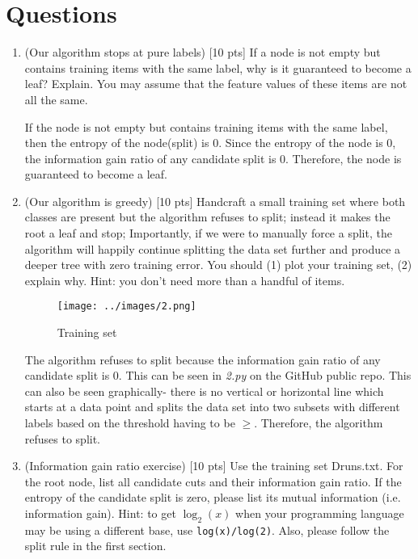 \documentclass[a4paper]{article}
\theoremstyle{definition}
\newenvironment{soln}{
    \leavevmode\color{blue}\ignorespaces
}{}
\begin{document}
\section{Questions}
\begin{enumerate}
\item (Our algorithm stops at pure labels) [10 pts] If a node is not empty but contains training items with the same label, why is it guaranteed to become a leaf?  Explain. You may assume that the feature values of these items are not all the same. \\

\begin{soln}
  If the node is not empty but contains training items with the same label, then the entropy of the node(split) is 0. Since the entropy of the node is 0, the information gain ratio of any candidate split is 0. Therefore, the node is guaranteed to become a leaf.
\end{soln}



\item (Our algorithm is greedy)  [10 pts] Handcraft a small training set where both classes are present but the algorithm refuses to split; instead it makes the root a leaf and stop;
Importantly, if we were to manually force a split, the algorithm will happily continue splitting the data set further and produce a deeper tree with zero training error.
You should (1) plot your training set, (2) explain why.  Hint: you don't need more than a handful of items. \\

\begin{soln}
  \begin{figure}[H]
    \centering
    \texttt{[image: ../images/2.png]}
    \caption{Training set}
  \end{figure}
  The algorithm refuses to split because the information gain ratio of any candidate split is 0. This can be seen in \textit{2.py} on the GitHub public repo. This can also be seen graphically- there is no vertical or horizontal line which starts at a data point and splits the data set into two subsets with different labels based on the threshold having to be $\ge$. Therefore, the algorithm refuses to split.
\end{soln}

\item (Information gain ratio exercise)  [10 pts] Use the training set Druns.txt.  For the root node, list all candidate cuts and their information gain ratio. If the entropy of the candidate split is zero, please list its mutual information (i.e. information gain). Hint: to get $\log_2(x)$ when your programming language may be using a different base, use \verb|log(x)/log(2)|. Also, please follow the split rule in the first section. \\



\end{enumerate}
\end{document}

